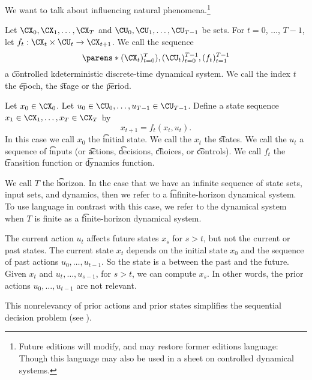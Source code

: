 

We want to talk about influencing natural phenomena.\footnote{Future editions will modify, and may restore former editions language:  Though this language may also be used in a sheet on  controlled dynamical systems.}


Let $\CX_0, \CX_1, \dots, \CX_{T}$ and $\CU_0, \CU_1, \dots, \CU_{T-1}$ be sets.
For $t = 0$, $\dots$, $T-1$, let $f_{t}: \CX_t \times \CU_t \to \CX_{t+1}$.
We call the sequence
\[
	\parens*{(\CX_t)_{t = 0}^{T}), (\CU_t)_{t=0}^{T-1}, (f_t)_{t=1}^{T-1}}
\]
a \t{controlled kdeterministic discrete-time dynamical system}.
We call the index $t$ the \t{epoch}, the \t{stage} or the \t{period}.

Let $x_0 \in \CX_0$.
Let $u_0 \in \CU_0, \dots, u_{T-1} \in \CU_{T-1}$. Define a state sequence $x_1 \in \CX_1, \dots, x_T \in \CX_T$ by
\[
    x_{t+1} = f_t(x_t, u_t).
\]
In this case we call $x_0$ the \t{initial state}.
We call the $x_t$ the \t{states}.
We call the $u_t$ a sequence of \t{inputs} (or \t{actions}, \t{decisions}, \t{choices}, or \t{controls}).
We call $f_t$ the \t{transition function} or \t{dynamics function}.

We call $T$ the \t{horizon}.
In the case that we have an infinite sequence of state sets, input sets, and dynamics, then we refer to a \t{infinite-horizon} dynamical system.
To use language in contrast with this case, we refer to the dynamical system when $T$ is finite as a \t{finite-horizon} dynamical system.


The current action $u_t$ affects future states $x_{s}$ for $s > t$, but not the current or past states.
The current state $x_t$ depends on the initial state $x_0$ and the sequence of past actions $u_0, \dots, u_{t-1}$.
So the state is a  between the past and the future.
Given $x_t$ and $u_t, \dots, u_{s-1}$, for $s > t$, we can compute $x_s$.
In other words, the prior actions $u_0, \dots, u_{t-1}$ are not relevant.

This nonrelevancy of prior actions and prior states simplifies the sequential decision problem (see ).


